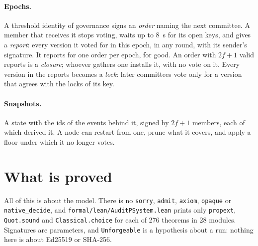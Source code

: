 \documentclass[10pt,a4paper]{article}
\newcommand{\code}[1]{\texttt{#1}}
\begin{document}
\paragraph{Epochs.} A threshold identity of governance signs an \emph{order} naming the next
committee. A member that receives it stops voting, waits up to 8~s for its open keys, and gives a
\emph{report}: every version it voted for in this epoch, in any round, with its sender's signature. It
reports for one order per epoch, for good. An order with $2f+1$ valid reports is a \emph{closure}; whoever
gathers one installs it, with no vote on it. Every version in the reports becomes a \emph{lock}: later
committees vote only for a version that agrees with the locks of its key.

\paragraph{Snapshots.} A state with the ids of the events behind it, signed by $2f+1$ members, each
of which derived it. A node can restart from one, prune what it covers, and apply a floor under which it
no longer votes.

\section{What is proved}

All of this is about the model. There is no \code{sorry}, \code{admit}, \code{axiom}, \code{opaque}
or \code{native\_decide}, and \code{formal/lean/AuditPSystem.lean} prints only \code{propext},
\code{Quot.sound} and \code{Classical.choice} for each of 276 theorems in 28 modules. Signatures are
parameters, and \code{Unforgeable} is a hypothesis about a run: nothing here is about Ed25519 or SHA-256.
\end{document}
